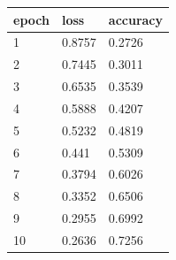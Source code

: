 \begin{tabular}{lll}
\hline
epoch & loss & accuracy \\
\hline
1 & 0.8757 & 0.2726 \\
2 & 0.7445 & 0.3011 \\
3 & 0.6535 & 0.3539 \\
4 & 0.5888 & 0.4207 \\
5 & 0.5232 & 0.4819 \\
6 & 0.441 & 0.5309 \\
7 & 0.3794 & 0.6026 \\
8 & 0.3352 & 0.6506 \\
9 & 0.2955 & 0.6992 \\
10 & 0.2636 & 0.7256 \\
\hline
\end{tabular}
